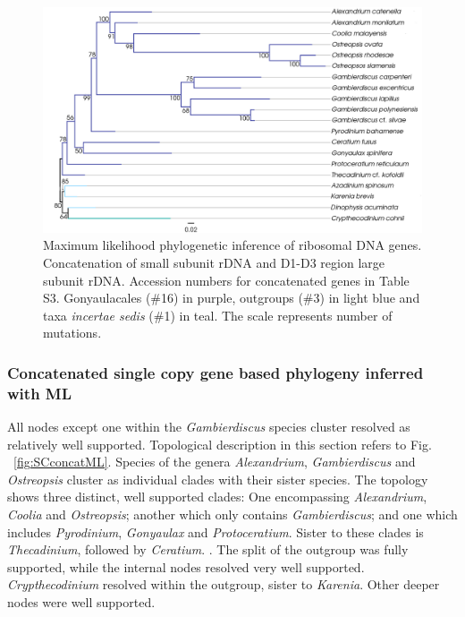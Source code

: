 \documentclass[12pt]{article}
\begin{document}
\begin{figure} 
\includegraphics[scale=.4]{figures/rDNA-ML.png} 
\caption{Maximum likelihood phylogenetic inference of ribosomal DNA genes. Concatenation of small subunit rDNA and D1-D3 region large subunit rDNA. Accession numbers for concatenated genes in Table S3. Gonyaulacales (\#16) in purple, outgroups (\#3) in light blue and taxa \textit{incertae sedis} (\#1) in teal. The scale represents number of mutations.} 
\label{fig:rdna}
\end{figure} 
\FloatBarrier

\subsubsection*{Concatenated single copy gene based phylogeny inferred with ML}
\FloatBarrier
All nodes except one within the \emph{Gambierdiscus} species cluster resolved as relatively well supported. 
Topological description in this section refers to Fig. ~\ref{fig:SCconcatML}. 
Species of the genera \emph{Alexandrium}, \emph{Gambierdiscus} and \emph{Ostreopsis} cluster as individual clades with their sister species.  
The topology shows three distinct, well supported clades: 
One encompassing \emph{Alexandrium}, \emph{Coolia} and \emph{Ostreopsis}; another which only contains \emph{Gambierdiscus}; and one which includes \emph{Pyrodinium}, \emph{Gonyaulax} and \emph{Protoceratium}. 
Sister to these clades is \emph{Thecadinium}, followed by \emph{Ceratium}. .
The split of the outgroup was fully supported, while the internal nodes resolved very well supported. 
\emph{Crypthecodinium} resolved within the outgroup, sister to \emph{Karenia}. 
Other deeper nodes were well supported.
 
\end{document}

